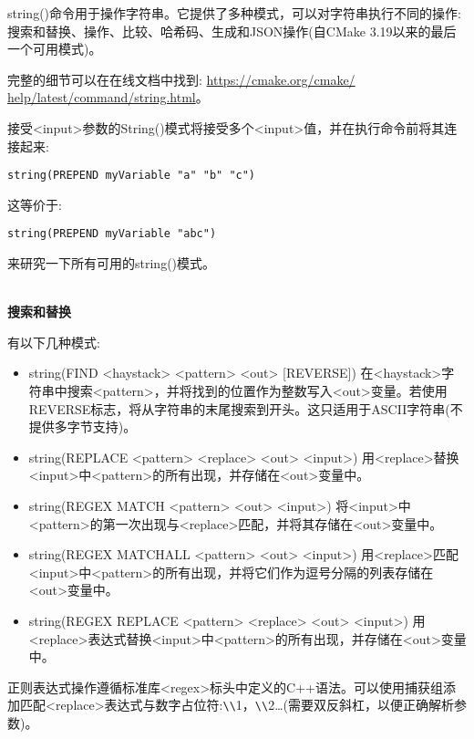 string()命令用于操作字符串。它提供了多种模式，可以对字符串执行不同的操作:搜索和替换、操作、比较、哈希码、生成和JSON操作(自CMake 3.19以来的最后一个可用模式)。

完整的细节可以在在线文档中找到: \url{https://cmake.org/cmake/ help/latest/command/string.html}。

接受<input>参数的String()模式将接受多个<input>值，并在执行命令前将其连接起来:

\begin{lstlisting}[style=styleCMake]
string(PREPEND myVariable "a" "b" "c")
\end{lstlisting}

这等价于:

\begin{lstlisting}[style=styleCMake]
string(PREPEND myVariable "abc")
\end{lstlisting}

来研究一下所有可用的string()模式。

\hspace*{\fill} \\ %
\noindent
\textbf{搜索和替换}

有以下几种模式:

\begin{itemize}
\item 
string(FIND <haystack> <pattern> <out> [REVERSE]) 在<haystack>字符串中搜索<pattern>，并将找到的位置作为整数写入<out>变量。若使用REVERSE标志，将从字符串的末尾搜索到开头。这只适用于ASCII字符串(不提供多字节支持)。

\item 
string(REPLACE <pattern> <replace> <out> <input>) 用<replace>替换<input>中<pattern>的所有出现，并存储在<out>变量中。

\item 
string(REGEX MATCH <pattern> <out> <input>) 将<input>中<pattern>的第一次出现与<replace>匹配，并将其存储在<out>变量中。

\item 
string(REGEX MATCHALL <pattern> <out> <input>) 用<replace>匹配<input>中<pattern>的所有出现，并将它们作为逗号分隔的列表存储在<out>变量中。

\item
string(REGEX REPLACE <pattern> <replace> <out> <input>) 用<replace>表达式替换<input>中<pattern>的所有出现，并存储在<out>变量中。
\end{itemize}

正则表达式操作遵循标准库<regex>标头中定义的C++语法。可以使用捕获组添加匹配<replace>表达式与数字占位符:\verb|\|\verb|\|1，\verb|\|\verb|\|2…(需要双反斜杠，以便正确解析参数)。

